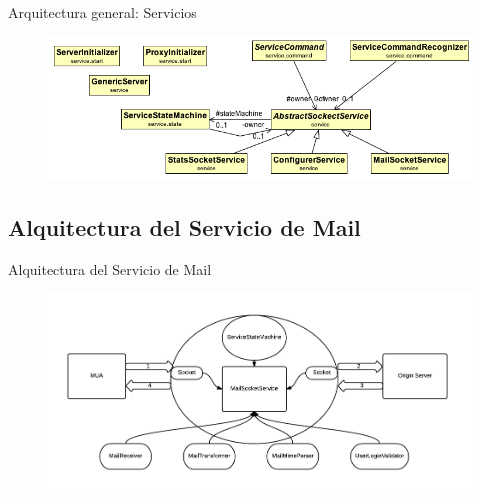 \documentclass{beamer}
\begin{document}
\begin{frame}{Arquitectura general: Servicios}
\begin{figure}[H]
\begin{center}
\includegraphics[scale=0.45]{images/SocketService.png}
\end{center}
\end{figure}
\end{frame}


\subsection{Alquitectura del Servicio de Mail}
\begin{frame}{Alquitectura del Servicio de Mail}
\begin{figure}[H]
\begin{center}
\includegraphics[scale=0.47]{images/charts/ArquitecturaPOXY.png}
\end{center}
\end{figure}
\end{frame}

\begin{frame}

\end{frame}
\end{document}
